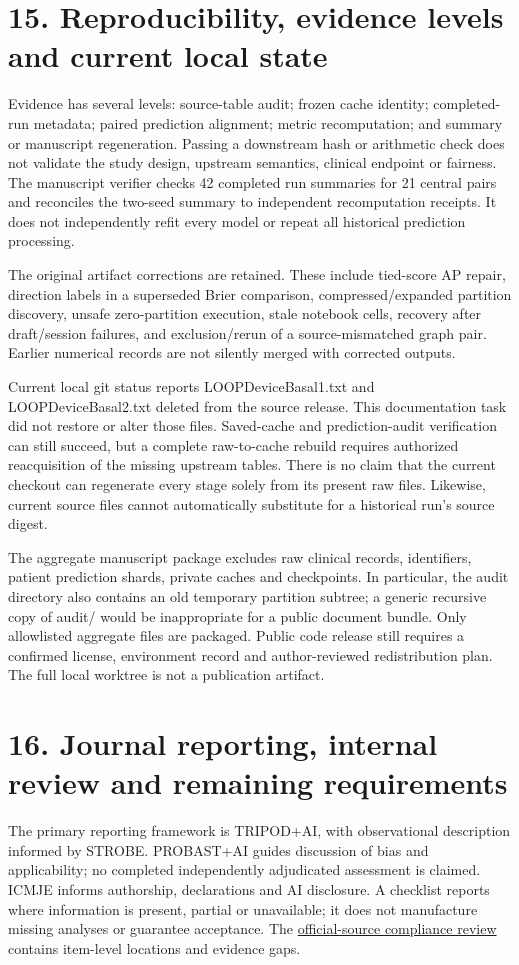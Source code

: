 \documentclass[11pt,a4paper]{article}
\begin{document}
\section*{15. Reproducibility, evidence levels and current local state}
Evidence has several levels: source-table audit; frozen cache identity; completed-run metadata; paired prediction alignment; metric recomputation; and summary or manuscript regeneration. Passing a downstream hash or arithmetic check does not validate the study design, upstream semantics, clinical endpoint or fairness. The manuscript verifier checks 42 completed run summaries for 21 central pairs and reconciles the two-seed summary to independent recomputation receipts. It does not independently refit every model or repeat all historical prediction processing.

The original artifact corrections are retained. These include tied-score AP repair, direction labels in a superseded Brier comparison, compressed/expanded partition discovery, unsafe zero-partition execution, stale notebook cells, recovery after draft/session failures, and exclusion/rerun of a source-mismatched graph pair. Earlier numerical records are not silently merged with corrected outputs.

Current local git status reports LOOPDeviceBasal1.txt and LOOPDeviceBasal2.txt deleted from the source release. This documentation task did not restore or alter those files. Saved-cache and prediction-audit verification can still succeed, but a complete raw-to-cache rebuild requires authorized reacquisition of the missing upstream tables. There is no claim that the current checkout can regenerate every stage solely from its present raw files. Likewise, current source files cannot automatically substitute for a historical run's source digest.

The aggregate manuscript package excludes raw clinical records, identifiers, patient prediction shards, private caches and checkpoints. In particular, the audit directory also contains an old temporary partition subtree; a generic recursive copy of audit/ would be inappropriate for a public document bundle. Only allowlisted aggregate files are packaged. Public code release still requires a confirmed license, environment record and author-reviewed redistribution plan. The full local worktree is not a publication artifact.

\section*{16. Journal reporting, internal review and remaining requirements}
The primary reporting framework is TRIPOD+AI, with observational description informed by STROBE. PROBAST+AI guides discussion of bias and applicability; no completed independently adjudicated assessment is claimed. ICMJE informs authorship, declarations and AI disclosure. A checklist reports where information is present, partial or unavailable; it does not manufacture missing analyses or guarantee acceptance. The \href{../manuscript/reviews/reporting_standards_review_2026_11_08.md}{official-source compliance review} contains item-level locations and evidence gaps.
\end{document}
